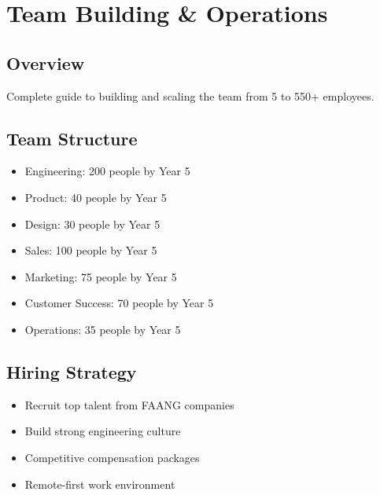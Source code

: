 \chapter{Team Building \& Operations}
\label{ch:team-operations}

\section{Overview}
Complete guide to building and scaling the \lifeos{} team from 5 to 550+ employees.

\section{Team Structure}
\begin{itemize}
    \item Engineering: 200 people by Year 5
    \item Product: 40 people by Year 5
    \item Design: 30 people by Year 5
    \item Sales: 100 people by Year 5
    \item Marketing: 75 people by Year 5
    \item Customer Success: 70 people by Year 5
    \item Operations: 35 people by Year 5
\end{itemize}

\section{Hiring Strategy}
\begin{itemize}
    \item Recruit top talent from FAANG companies
    \item Build strong engineering culture
    \item Competitive compensation packages
    \item Remote-first work environment
\end{itemize}

